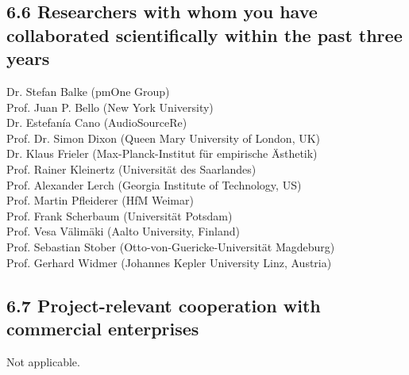 \documentclass[11pt,a4paper]{article}
\theoremstyle{plain} \newtheorem{define}{Definition}[section]
\begin{document}
{%
\subsection*{6.6 Researchers with whom you have collaborated scientifically within the past three years}


Dr. Stefan Balke (pmOne Group)\\
Prof. Juan P. Bello (New York University)\\
Dr. Estefanía Cano (AudioSourceRe)\\
Prof. Dr. Simon Dixon (Queen Mary University of London, UK)\\
Dr. Klaus Frieler (Max-Planck-Institut für empirische Ästhetik)\\
Prof. Rainer Kleinertz (Universit{\"a}t des Saarlandes)\\
Prof. Alexander Lerch (Georgia Institute of Technology, US)\\
Prof. Martin Pfleiderer (HfM Weimar)\\
Prof. Frank Scherbaum (Universit\"at Potsdam)\\
Prof. Vesa V{\"a}lim{\"a}ki (Aalto University, Finland)\\
Prof. Sebastian Stober (Otto-von-Guericke-Universit{\"a}t Magdeburg)\\
Prof. Gerhard Widmer (Johannes Kepler University Linz, Austria)

\subsection*{6.7 Project-relevant cooperation with commercial enterprises}
%
\vspace{-0.4cm}
Not applicable.
\vspace{-0.4cm}


}
\end{document}
